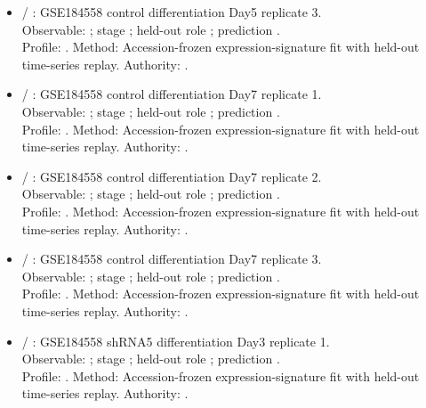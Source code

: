 \begin{itemize}
\item {} / : GSE184558 control differentiation Day5 replicate 3.\\ Observable: ; stage ; held-out role ; prediction .\\ Profile: . Method: Accession-frozen expression-signature fit with held-out time-series replay. Authority: .
\item {} / : GSE184558 control differentiation Day7 replicate 1.\\ Observable: ; stage ; held-out role ; prediction .\\ Profile: . Method: Accession-frozen expression-signature fit with held-out time-series replay. Authority: .
\item {} / : GSE184558 control differentiation Day7 replicate 2.\\ Observable: ; stage ; held-out role ; prediction .\\ Profile: . Method: Accession-frozen expression-signature fit with held-out time-series replay. Authority: .
\item {} / : GSE184558 control differentiation Day7 replicate 3.\\ Observable: ; stage ; held-out role ; prediction .\\ Profile: . Method: Accession-frozen expression-signature fit with held-out time-series replay. Authority: .
\item {} / : GSE184558 shRNA5 differentiation Day3 replicate 1.\\ Observable: ; stage ; held-out role ; prediction .\\ Profile: . Method: Accession-frozen expression-signature fit with held-out time-series replay. Authority: .

\end{itemize}
